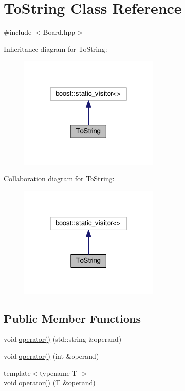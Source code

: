 \hypertarget{class_to_string}{}\section{To\+String Class Reference}
\label{class_to_string}


{\ttfamily \#include $<$Board.\+hpp$>$}



Inheritance diagram for To\+String\+:
\nopagebreak
\begin{figure}[H]
\begin{center}
\leavevmode
\includegraphics[width=194pt]{class_to_string__inherit__graph}
\end{center}
\end{figure}


Collaboration diagram for To\+String\+:
\nopagebreak
\begin{figure}[H]
\begin{center}
\leavevmode
\includegraphics[width=194pt]{class_to_string__coll__graph}
\end{center}
\end{figure}
\subsection*{Public Member Functions}
\begin{DoxyCompactItemize}
\item 
void \hyperlink{class_to_string_a953a519a60e5f641c0ffa04ec9fbc138}{operator()} (std\+::string \&operand)
\item 
void \hyperlink{class_to_string_a20f6c841899ce3f8c53e769a74516f05}{operator()} (int \&operand)
\item 
{\footnotesize template$<$typename T $>$ }\\void \hyperlink{class_to_string_abeaa86b76bb76389dcb14b700590402b}{operator()} (T \&operand)
\end{DoxyCompactItemize}
